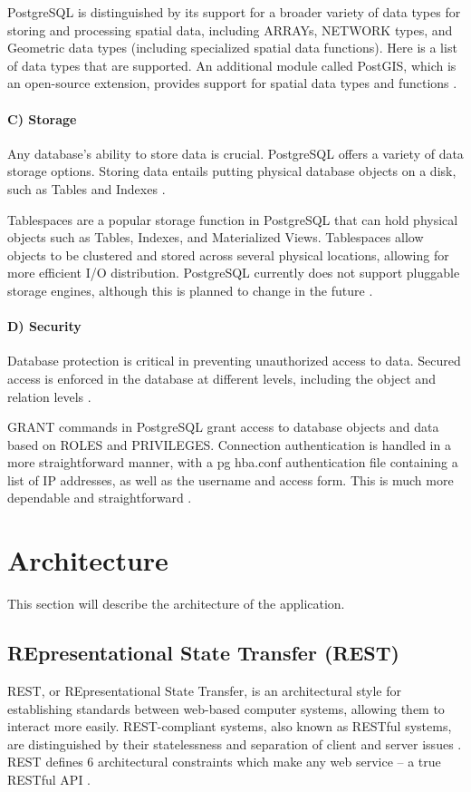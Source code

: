 PostgreSQL is distinguished by its support for a broader variety of data types for storing and processing spatial data, including ARRAYs, NETWORK types, and Geometric data types (including specialized spatial data functions). Here is a list of data types that are supported. An additional module called PostGIS, which is an open-source extension, provides support for spatial data types and functions \cite{PostgreFeatures}.

\paragraph{C) Storage}
Any database's ability to store data is crucial. PostgreSQL offers a variety of data storage options. Storing data entails putting physical database objects on a disk, such as Tables and Indexes \cite{PostgreFeatures}.

Tablespaces are a popular storage function in PostgreSQL that can hold physical objects such as Tables, Indexes, and Materialized Views. Tablespaces allow objects to be clustered and stored across several physical locations, allowing for more efficient I/O distribution. PostgreSQL currently does not support pluggable storage engines, although this is planned to change in the future \cite{PostgreFeatures}.

\paragraph{D) Security}
Database protection is critical in preventing unauthorized access to data. Secured access is enforced in the database at different levels, including the object and relation levels \cite{PostgreFeatures}.

GRANT commands in PostgreSQL grant access to database objects and data based on ROLES and PRIVILEGES. Connection authentication is handled in a more straightforward manner, with a pg hba.conf authentication file containing a list of IP addresses, as well as the username and access form. This is much more dependable and straightforward \cite{PostgreFeatures}.
    
\section{Architecture}
This section will describe the architecture of the application.

\subsection{REpresentational State Transfer (REST)}
REST, or REpresentational State Transfer, is an architectural style for establishing standards between web-based computer systems, allowing them to interact more easily. REST-compliant systems, also known as RESTful systems, are distinguished by their statelessness and separation of client and server issues \cite{RESTAbout}. REST defines 6 architectural constraints which make any web service – a true RESTful API \cite{REST}.

